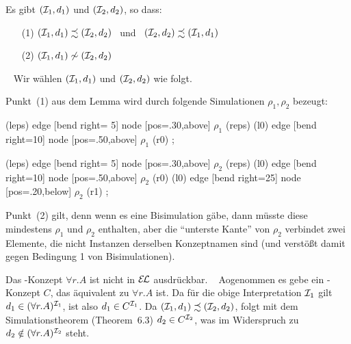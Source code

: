 \documentclass[fontsize=11pt, twoside=false, numbers=autoenddot]{scrbook}
\begin{document}
Es gibt $(\mathcal{I}_1,d_1)$ und $(\mathcal{I}_2,d_2)$, so dass:
%
\begin{enumerate}
  \item[(1)]
    $(\mathcal{I}_1,d_1) \precsim (\mathcal{I}_2,d_2)$ ~und~ $(\mathcal{I}_2,d_2) \precsim (\mathcal{I}_1,d_1)$
  \item[(2)]
    $(\mathcal{I}_1,d_1) \not\sim (\mathcal{I}_2,d_2)$
\end{enumerate}
%
\parII
{}~
Wir wählen $(\mathcal{I}_1,d_1)$ und $(\mathcal{I}_2,d_2)$ wie folgt.
%
\begin{center}
  \begin{tikzpicturetwointerp}
  \end{tikzpicturetwointerp}    
\end{center}
%
Punkt~(1) aus dem Lemma wird durch folgende Simulationen $\rho_1,\rho_2$ bezeugt:
\begin{center}
    \begin{tikzpicturetwointerp}
        (leps) edge [bend right= 5] node [pos=.30,above] {$\rho_1$} (reps)
        (l0)   edge [bend right=10] node [pos=.50,above] {$\rho_1$} (r0)
      ;
    \end{tikzpicturetwointerp}
    \hspace*{20mm}
    \begin{tikzpicturetwointerp}
        (leps) edge [bend right= 5] node [pos=.30,above] {$\rho_2$} (reps)
        (l0)   edge [bend right=10] node [pos=.50,above] {$\rho_2$} (r0)
        (l0)   edge [bend right=25] node [pos=.20,below] {$\rho_2$} (r1)
      ;
    \end{tikzpicturetwointerp}
\end{center}
%
Punkt~(2) gilt, denn wenn es eine Bisimulation gäbe,
dann müsste diese mindestens $\rho_1$ und $\rho_2$ enthalten,
aber die "`unterste Kante"' von $\rho_2$ verbindet zwei Elemente,
die nicht Instanzen derselben Konzeptnamen sind
(und verstößt damit gegen Bedingung 1 von Bisimulationen).
\qedhere

\goodbreak
\parIII
{}
Das \ALC-Konzept $\forall r.A$ ist nicht in $\mathcal{E\!\!\:L}$ ausdrückbar.
%
\parII
{}~
Aogenommen es gebe ein \EL-Konzept $C$, das äquivalent zu $\forall r.A$ ist.
Da für die obige Interpretation $\mathcal{I}_1$ gilt $d_1 \in (\forall r.A)^{\mathcal{I}_1}$,
ist also $d_1 \in C^{\mathcal{I}_1}$.
Da $(\mathcal{I}_1,d_1) \precsim (\mathcal{I}_2,d_2)$, folgt mit dem Simulationstheorem
(Theorem~6.3) $d_2 \in C^{\mathcal{I}_2}$,
was im Widerspruch zu $d_2 \notin (\forall r.A)^{\mathcal{I}_2}$ steht.
\qedhere
\end{document}

